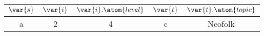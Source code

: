 \begin{tabular}{|c|c|c|c|c|}
	\hline
	$\var{s}$ & $\var{i}$ & $\var{i}.\atom{level}$ & $\var{t}$ & $\var{t}.\atom{topic}$ \\ \hline
	a & 2 & 4 & c & Neofolk \\ \hline
\end{tabular}
